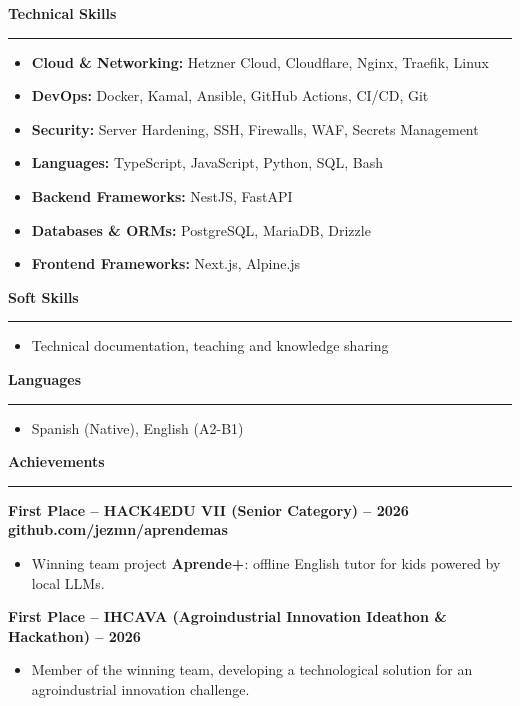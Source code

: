 \documentclass[
]{article}
\newcommand{\sect}[1]{\vspace{4pt}\noindent\textbf{#1}\par\vspace{-2pt}\noindent\rule{\linewidth}{0.4pt}\par\vspace{2pt}}
\begin{document}
\sect{Technical Skills}
\vspace*{10pt}

\begin{itemize}
\item
  \textbf{Cloud \& Networking:} Hetzner Cloud, Cloudflare, Nginx, Traefik, Linux
\item
  \textbf{DevOps:} Docker, Kamal, Ansible, GitHub Actions, CI/CD, Git
\item
  \textbf{Security:} Server Hardening, SSH, Firewalls, WAF, Secrets Management
\item
  \textbf{Languages:} TypeScript, JavaScript, Python, SQL, Bash
\item
  \textbf{Backend Frameworks:} NestJS, FastAPI
\item
  \textbf{Databases \& ORMs:} PostgreSQL, MariaDB, Drizzle
\item
  \textbf{Frontend Frameworks:} Next.js, Alpine.js
\end{itemize}
\vspace*{15pt}

\sect{Soft Skills}
\vspace*{10pt}

\begin{itemize}
\item
  Technical documentation, teaching and knowledge sharing
\end{itemize}

\newpage
\sect{Languages}

\begin{itemize}
\item
  Spanish (Native), English (A2-B1)
\end{itemize}
\vspace*{15pt}

\sect{Achievements}
\vspace*{10pt}

\textbf{First Place -- HACK4EDU VII (Senior Category) -- 2026}
\hfill \textbf{github.com/jezmn/aprendemas}

\begin{itemize}
\item
  Winning team project \textbf{Aprende+}: offline English tutor for
  kids powered by local LLMs.
\end{itemize}

\textbf{First Place -- IHCAVA (Agroindustrial Innovation Ideathon \&
Hackathon) -- 2026}

\begin{itemize}
\item
  Member of the winning team, developing a technological solution for an
  agroindustrial innovation challenge.
\end{itemize}
\end{document}
